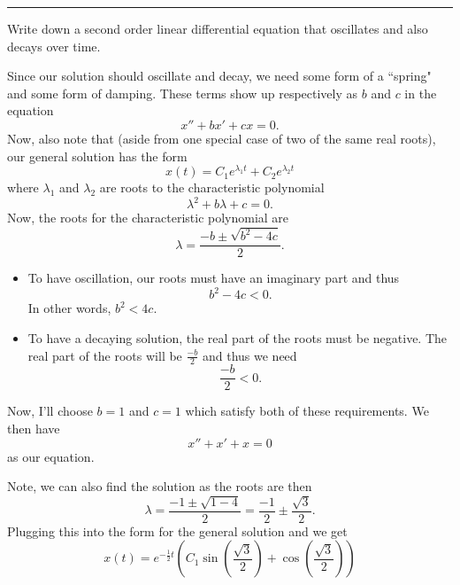 \documentclass[12pt]{article} %
\begin{document}
\hrule
\begin{problem}
Write down a second order linear differential equation that oscillates and also decays over time.
\end{problem}
\begin{solution}
Since our solution should oscillate and decay, we need some form of a ``spring" and some form of damping.  These terms show up respectively as $b$ and $c$ in the equation
\[
x''+bx'+cx=0.
\]
Now, also note that (aside from one special case of two of the same real roots), our general solution has the form
\[
x(t)=C_1 e^{\lambda_1 t}+C_2e^{\lambda_2 t}
\]
where $\lambda_1$ and $\lambda_2$ are roots to the characteristic polynomial
\[
\lambda^2+b\lambda + c =0.
\]
Now, the roots for the characteristic polynomial are
\[
\lambda = \frac{-b \pm \sqrt{b^2-4c}}{2}.
\]
\begin{itemize}
    \item To have oscillation, our roots must have an imaginary part and thus 
    \[
    b^2-4c<0.
    \]
    In other words, $b^2<4c.$
    \item To have a decaying solution, the real part of the roots must be negative. The real part of the roots will be $\frac{-b}{2}$ and thus we need
    \[
    \frac{-b}{2}<0.
    \]
\end{itemize}
Now, I'll choose $b=1$ and $c=1$ which satisfy both of these requirements. We then have
\[
x''+x'+x=0
\]
as our equation.

Note, we can also find the solution as the roots are then
\[
\lambda = \frac{-1\pm \sqrt{1-4}}{2}=\frac{-1}{2}\pm \frac{\sqrt{3}}{2}.
\]
Plugging this into the form for the general solution and we get
\[
x(t)=e^{-\frac{1}{2}t}\left(C_1 \sin\left(\frac{\sqrt{3}}{2}\right) + \cos\left(\frac{\sqrt{3}}{2}\right)\right)
\]
\end{solution}
\end{document}
